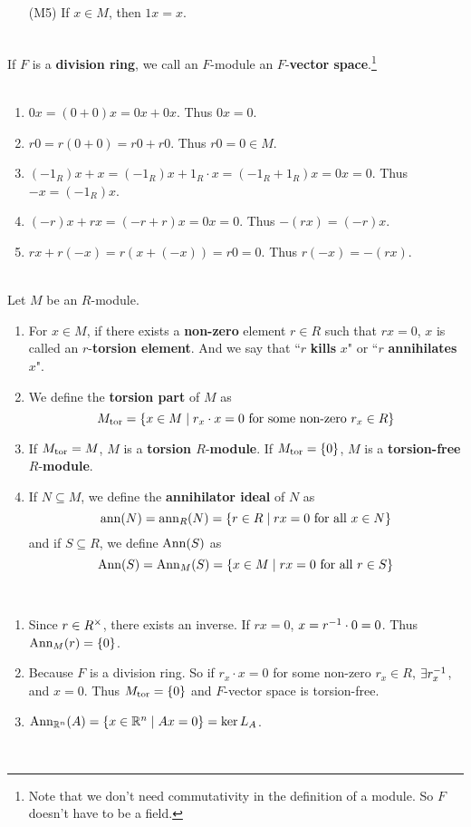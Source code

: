 \begin{enumerate}
	\item[{\sffamily (M5)}] If $x\in M$, then $1x = x$.
\end{enumerate}~
\\
 If $F$ is a \textbf{division ring}, we call an $F$-module an $F$-\textbf{vector space}.\footnote{Note that we don't need commutativity in the definition of a module. So $F$ doesn't have to be a field.}\\
\\
\begin{enumerate}
	\item $0x = (0+0)x = 0x + 0x$. Thus $0x = 0$.
	\item $r0 = r(0+0) = r0 + r0$. Thus $r0 = 0\in M$.
	\item $(-1_R)x + x = (-1_R)x + 1_R\cdot x = (-1_R+1_R)x = 0x = 0$. Thus $-x = (-1_R)x$.
	\item $(-r)x + rx = (-r+r)x = 0x = 0$. Thus $-(rx) = (-r)x$.
	\item $rx + r(-x) = r(x + (-x)) = r0 = 0$. Thus $r(-x) = -(rx)$.
\end{enumerate}~
\\
 Let $M$ be an $R$-module.
\begin{enumerate}
	\item For $x\in M$, if there exists a \textbf{non-zero} element $r\in R$ such that $rx = 0$, $x$ is called an $r$-\textbf{torsion element}. And we say that ``$r$ \textbf{kills} $x$" or ``$r$ \textbf{annihilates} $x$".
	\item We define the \textbf{torsion part} of $M$ as $$M_{\text{tor}} = \{x\in M \mid r_x\cdot x = 0 \text{ for some non-zero } r_x\in R\}$$
	\item If $M_{\text{tor}} = M$, $M$ is a \textbf{torsion $R$}-\textbf{module}. If $M_{\text{tor}} = \{0\}$, $M$ is a \textbf{torsion-free $R$}-\textbf{module}.
	\item If $N\subseteq M$, we define the \textbf{annihilator ideal} of $N$ as
	$$\operatorname{ann}(N) = \operatorname{ann}_R(N) = \{r\in R\mid rx = 0 \text{ for all } x\in N\}$$
	and if $S\subseteq R$, we define $\operatorname{Ann}(S)$ as
	$$\operatorname{Ann}(S) = \operatorname{Ann}_M(S) = \{x\in M \mid rx = 0 \text{ for all }r\in S\}$$
\end{enumerate}~
\\
\begin{enumerate}
	\item Since $r\in R^\times$, there exists an inverse. If $rx = 0$, $x = r^{-1} \cdot 0 = 0$. Thus $\operatorname{Ann}_M(r) = \{0\}$.
	\item Because $F$ is a division ring. So if $r_x\cdot x = 0$ for some non-zero $r_x\in R$, $\exists r_x^{-1}$, and $x = 0$. Thus $M_{\text{tor}} = \{0\}$ and $F$-vector space is torsion-free.
	\item $\operatorname{Ann}_{\mathbb{R}^n}(A) = \{x \in \mathbb{R}^n \mid Ax = 0\} = \ker L_A$.
\end{enumerate}~
